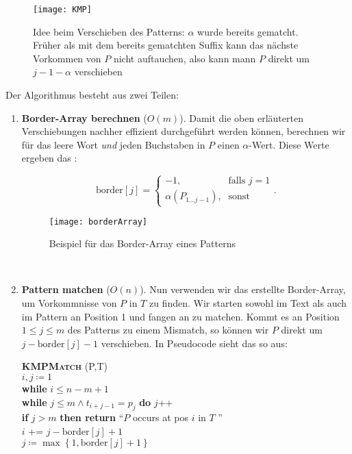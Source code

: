 \begin{figure}[H]
  \texttt{[image: KMP]}
  \captionsetup{width=.5\textwidth}
  \caption{Idee beim Verschieben des Patterns: \( \alpha \) wurde bereits gematcht. Früher als mit dem bereits gematchten Suffix kann das nächste Vorkommen von \( P \) nicht auftauchen, also kann mann \( P \) direkt um \( j - 1 - \alpha \) verschieben}
\end{figure}

Der Algorithmus besteht aus zwei Teilen:
\begin{enumerate}
  \item \textbf{Border-Array berechnen} (\( O(m) \)). Damit die oben erläuterten Verschiebungen nachher effizient durchgeführt werden können, berechnen wir für das leere Wort \emph{und} jeden Buchstaben in \( P \) einen \( \alpha \)-Wert. Diese Werte ergeben das \label{def:borderArray}:

  \begin{minipage}{.55\textwidth}
    \begin{equation*}
      \text{border}[j] = \begin{cases}
        -1\text{,} &\text{falls } j = 1 \\
        \alpha(P_{1 \dots j-1})\text{,} &\text{sonst}
      \end{cases}\text{.}
    \end{equation*}
  \end{minipage}
  \hfill
  \begin{minipage}{.35\textwidth}
    \begin{figure}[H]
      \texttt{[image: borderArray]}
      \caption{Beispiel für das Border-Array eines Patterns}
    \end{figure}
  \end{minipage} \\

  \item \textbf{Pattern matchen} (\( O(n) \)). Nun verwenden wir das erstellte Border-Array, um Vorkommnisse von \( P \) in \( T \) zu finden. Wir starten sowohl im Text als auch im Pattern an Position 1 und fangen an zu matchen. Kommt es an Position \( 1 \leq j \leq m \) des Patterns zu einem Mismatch, so können wir \( P \) direkt um \( j - \text{border}[j] - 1 \) verschieben. In Pseudocode sieht das so aus:
  \begin{pseudocode}
    \textbf{\textsc{KMPMatch}} (P,T) \\
    \( i,j \coloneqq 1 \) \\
    \textbf{while} \( i \leq n - m + 1 \) \\
    \phantom{\enskip} \textbf{while} \( j \leq m \wedge t_{i+j-1} = p_j \) \textbf{do} \( j \)++ \\
    \phantom{\enskip} \textbf{if} \( j > m \) \textbf{then return} ``\( P \) occurs at pos \( i \) in \( T \) '' \\
    \phantom{\enskip} \( i \) += \( j - \text{border}[j] + 1 \) \\
    \phantom{\enskip} \( j \coloneqq \max\left \{ 1, \text{border}[j]+1 \right \} \)
  \end{pseudocode}
\end{enumerate}

